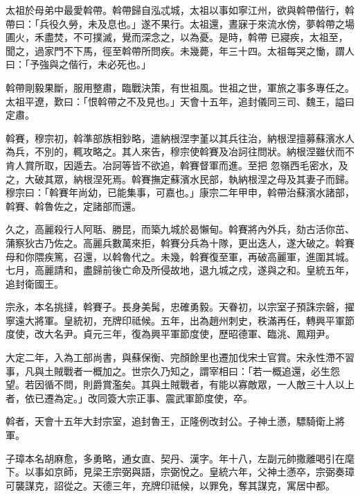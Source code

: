 \begin{pinyinscope}
 太祖於母弟中最愛斡帶。斡帶歸自泓忒城，太祖以事如寧江州，欲與斡帶偕行，斡帶曰：「兵役久勞，未及息也。」遂不果行。太祖還，晝寐于來流水傍，夢斡帶之場圃火，禾盡焚，不可撲滅，覺而深念之，以為憂。是時，斡帶
 已寢疾，太祖至，聞之，過家門不下馬，徑至斡帶所問疾。未幾薨，年三十四。太祖每哭之慟，謂人曰：「予強與之偕行，未必死也。」



 斡帶剛毅果斷，服用整肅，臨戰決策，有世祖風。世祖之世，軍旅之事多專任之。太祖平遼，歎曰：「恨斡帶之不及見也。」天會十五年，追封儀同三司、魏王，謚曰定肅。



 斡賽，穆宗初，斡準部族相鈔略，遣納根涅孛堇以其兵往治，納根涅擅募蘇濱水人為兵，不別的，輒攻略之。其人來告，穆宗使斡賽及冶訶往問狀。納根涅雖伏而不肯人賞所取，因遁去。冶訶等皆不欲追，斡賽督軍而進。至把
 忽嶺西毛密水，及之，大破其眾，納根涅死焉。斡賽撫定蘇濱水民部，執納根涅之母及其妻子而歸。穆宗曰：「斡賽年尚幼，已能集事，可嘉也。」康宗二年甲申，斡帶治蘇濱水諸部，斡賽、斡魯佐之，定諸部而還。



 久之，高麗殺行人阿聒、勝昆，而築九城於曷懶甸。斡賽將內外兵，劾古活你茁、蒲察狄古乃佐之。高麗兵數萬來拒，斡賽分兵為十隊，更出迭人，遂大破之。斡賽母和你隈疾篤，召還，以斡魯代之。未幾，斡賽復至軍，再破高麗軍，進圍其城。七月，高麗請和，盡歸前後亡命及所侵故地，退九城之戍，遂與之和。皇統五年，追封衛國王。



 宗永，本名挑撻，斡賽子。長身美髯，忠確勇毅。天眷初，以宗室子預誅宗磐，擢寧遠大將軍。皇統初，充牌印祗候。五年，出為趙州刺史，秩滿再任，轉興平軍節度使，改大名尹。貞元三年，復為興平軍節度使，歷昭德軍、臨洮、鳳翔尹。



 大定二年，入為工部尚書，與蘇保衡、完顏餘里也遷加伐宋士官賞。宋永性滯不習事，凡與土賊戰者一概加之。世宗久乃知之，謂宰相曰：「若一概追還，必生怨望。若因循不問，則爵賞濫矣。其與土賊戰者，有能以寡敵眾，一人敵三十人以上者，依已遷為定。」改同簽大宗正事、震武軍節度使，卒。



 斡者，天會十五年大封宗室，追封魯王，正隆例改封公。子神土懣，驃騎衛上將軍。



 子璋本名胡麻愈，多勇略，通女直、契丹、漢字。年十八，左副元帥撒離喝引在麾下。以事如京師，見梁王宗弼與語，宗弼悅之。皇統六年，父神土懣卒，宗弼奏璋可襲謀克，詔從之。天德三年，充牌印祗候，以罪免，奪其謀克，寓居中都。




\end{pinyinscope}
